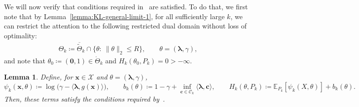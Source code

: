 \documentclass{article}
\theoremstyle{plain}
\newtheorem{lemma}[lemma]{Lemma}
\theoremstyle{definition}
\newcommand{\calC}{\mathcal C}
\newcommand{\calX}{\mathcal X}
\newcommand{\cvec}{\mathbf{c}}
\newcommand{\xvec}{\mathbf{x}}
\newcommand{\boldlambda}{\boldsymbol{\lambda}}
\begin{document}
We will now verify that conditions required in~ are satisfied. 
To do that, we first note that by Lemma~\ref{lemma:KL-general-limit-1}, for all sufficiently large $k$, we can restrict the attention to the following restricted dual domain without loss of optimality: 
\begin{align}
\Theta_k \coloneqq \overline{\widetilde\Theta}_k\cap\{\theta:\ \|\theta\|_2\le R\},\qquad \theta=(\boldlambda,\gamma),
\end{align}
and note that $\theta_0\coloneqq(\boldsymbol{0},1)\in\mathring{\Theta}_k$ and $H_k(\theta_0,P_k)=0 > -\infty$.

\begin{lemma}
\label{lemma:general-KL-2} 
Define, for $\xvec\in\calX$ and $\theta=(\boldlambda,\gamma)$,
\[
\psi_k(\xvec,\theta)\coloneqq\log\!\big(\gamma-\langle \boldlambda,g(\xvec)\rangle\big),
\qquad
b_k(\theta)\coloneqq1-\gamma+\inf_{\cvec\in\calC_k}\langle \boldlambda,\cvec\rangle,
\qquad
H_k(\theta,P_k)\coloneqq \mathbb{E}_{P_k}[\psi_k(X,\theta)]+b_k(\theta).
\]
Then, these terms satisfy the conditions required by~. 
\end{lemma}
\end{document}
